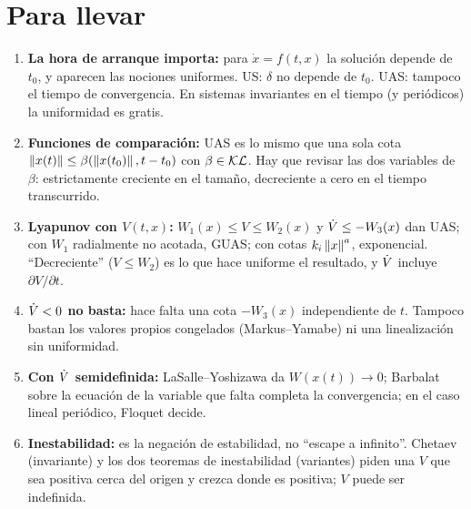 \section{Para llevar}
\label{sec:vt-cierre}

\begin{parallevar}
\begin{enumerate}
  \item \textbf{La hora de arranque importa:} para $\dot x=f(t,x)$ la solución depende de $t_0$, y aparecen las nociones uniformes. US: $\delta$ no depende de $t_0$. UAS: tampoco el tiempo de convergencia. En sistemas invariantes en el tiempo (y periódicos) la uniformidad es gratis.
  \item \textbf{Funciones de comparación:} UAS es lo mismo que una sola cota $\left\lVert x(t)\right\rVert\le\beta(\left\lVert x(t_0)\right\rVert,t-t_0)$ con $\beta\in\mathcal{KL}$. Hay que revisar las dos variables de $\beta$: estrictamente creciente en el tamaño, decreciente a cero en el tiempo transcurrido.
  \item \textbf{Lyapunov con $V(t,x)$:} $W_1(x)\le V\le W_2(x)$ y $\dot V\le-W_3(x)$ dan UAS; con $W_1$ radialmente no acotada, GUAS; con cotas $k_i\left\lVert x\right\rVert^a$, exponencial. ``Decreciente'' ($V\le W_2$) es lo que hace uniforme el resultado, y $\dot V$ incluye $\partial V/\partial t$.
  \item \textbf{$\dot V<0$ no basta:} hace falta una cota $-W_3(x)$ independiente de $t$. Tampoco bastan los valores propios congelados (Markus--Yamabe) ni una linealización sin uniformidad.
  \item \textbf{Con $\dot V$ semidefinida:} LaSalle--Yoshizawa da $W(x(t))\to0$; Barbalat sobre la ecuación de la variable que falta completa la convergencia; en el caso lineal periódico, Floquet decide.
  \item \textbf{Inestabilidad:} es la negación de estabilidad, no ``escape a infinito''. Chetaev (invariante) y los dos teoremas de inestabilidad (variantes) piden una $V$ que sea positiva cerca del origen y crezca donde es positiva; $V$ puede ser indefinida.
\end{enumerate}
\end{parallevar}

